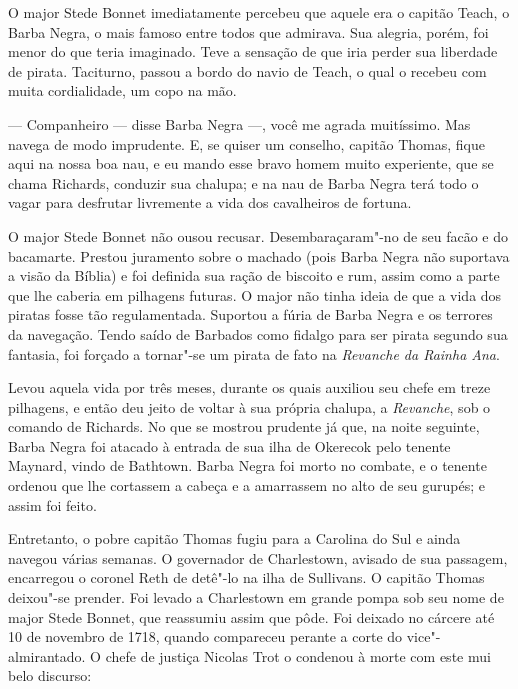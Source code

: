 O major Stede Bonnet imediatamente percebeu que aquele era o capitão Teach,
o Barba Negra, o mais famoso entre todos que admirava. Sua alegria, porém,
foi menor do que teria imaginado. Teve a sensação de que iria perder sua
liberdade de pirata. Taciturno, passou a bordo do navio de Teach, o qual o
recebeu com muita cordialidade, um copo na mão.

--- Companheiro --- disse Barba Negra ---, você me agrada muitíssimo. Mas navega de
modo imprudente. E, se quiser um conselho, capitão Thomas, fique aqui na
nossa boa nau, e eu mando esse bravo homem muito experiente, que se chama
Richards, conduzir sua chalupa; e na nau de Barba Negra terá todo o vagar
para desfrutar livremente a vida dos cavalheiros de fortuna.

O major Stede Bonnet não ousou recusar. Desemba\-raçaram"-no de seu facão e do
bacamarte. Prestou juramento sobre o machado (pois Barba Negra não
suportava a visão da Bíblia) e foi definida sua ração de biscoito e rum,
assim como a parte que lhe caberia em pilhagens futuras. O major não tinha
ideia de que a vida dos piratas fosse tão regulamentada. Suportou a fúria
de Barba Negra e os terrores da navegação. Tendo saído de Barbados como
fidalgo para ser pirata segundo sua fantasia, foi forçado a tornar"-se um
pirata de fato na \textit{Revanche da Rainha Ana}.

Levou aquela vida por três meses, durante os quais auxiliou seu chefe em
treze pilhagens, e então deu jeito de voltar à sua própria chalupa, a
\textit{Revanche}, sob o comando de Richards. No que se mostrou prudente
já que, na noite seguinte, Barba Negra foi atacado à entrada de sua ilha
de Okerecok pelo tenente Maynard, vindo de Bathtown. Barba Negra foi morto
no combate, e o tenente ordenou que lhe cortassem a cabeça e a amarrassem
no alto de seu gurupés; e assim foi feito.

Entretanto, o pobre capitão Thomas fugiu para a Carolina do Sul e ainda
navegou várias semanas. O governador de Charlestown, avisado de sua
passagem, encarregou o coronel Reth de detê"-lo na ilha de Sullivans. O
capitão Thomas deixou"-se prender. Foi levado a Charlestown em grande pompa
sob seu nome de major Stede Bonnet, que reassumiu assim que pôde. Foi
deixado no cárcere até 10 de novembro de 1718, quando compareceu perante a
corte do vice"-almirantado. O chefe de justiça Nicolas Trot o condenou à
morte com este mui belo discurso:

